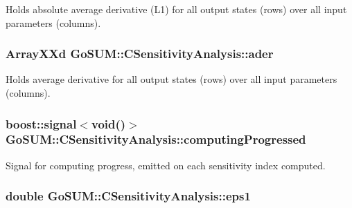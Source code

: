 Holds absolute average derivative (L1) for all output states (rows) over all input parameters (columns). 

\hypertarget{class_go_s_u_m_1_1_c_sensitivity_analysis_a242251c1a3100d2f27901211c5ed4383}{
\subsubsection[{ader}]{\setlength{\rightskip}{0pt plus 5cm}Array\-X\-Xd Go\-S\-U\-M\-::\-C\-Sensitivity\-Analysis\-::ader\hspace{0.3cm}{\ttfamily [private]}}}\label{class_go_s_u_m_1_1_c_sensitivity_analysis_a242251c1a3100d2f27901211c5ed4383}


Holds average derivative for all output states (rows) over all input parameters (columns). 

\hypertarget{class_go_s_u_m_1_1_c_sensitivity_analysis_a27d7ec32318e94f97569c7f8bc1080f8}{
\subsubsection[{computing\-Progressed}]{\setlength{\rightskip}{0pt plus 5cm}boost\-::signal$<$void()$>$ Go\-S\-U\-M\-::\-C\-Sensitivity\-Analysis\-::computing\-Progressed}}\label{class_go_s_u_m_1_1_c_sensitivity_analysis_a27d7ec32318e94f97569c7f8bc1080f8}


Signal for computing progress, emitted on each sensitivity index computed. 

\hypertarget{class_go_s_u_m_1_1_c_sensitivity_analysis_a4d493ceaedd73ca46b740a3f64b39a41}{
\subsubsection[{eps1}]{\setlength{\rightskip}{0pt plus 5cm}double Go\-S\-U\-M\-::\-C\-Sensitivity\-Analysis\-::eps1\hspace{0.3cm}{\ttfamily [private]}}}\label{class_go_s_u_m_1_1_c_sensitivity_analysis_a4d493ceaedd73ca46b740a3f64b39a41}


